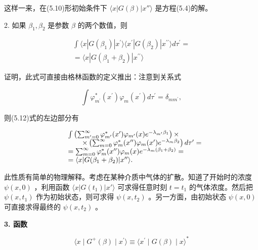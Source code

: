 这样一来，在(5.10)形初始条件下 $\langle x|G(\beta)|x''\rangle$ 是方程(5.4)的解。

2. 如果 $\beta_{1}, \beta_{2}$ 是参数 $\beta$ 的两个数值，则

\begin{equation*}
\begin{array}{l} \int \langle x | G (\beta_ {1}) | x ^ {\prime} \rangle \langle x ^ {\prime} | G (\beta_ {2}) | x ^ {\prime \prime} \rangle d \tau^ {\prime} = \\ = \langle x | G (\beta_ {1} + \beta_ {2}) | x ^ {\prime \prime} \rangle \end{array}\tag{5.12}
\end{equation*}

证明，此式可直接由格林函数的定义推出：注意到关系式

\begin{equation*}
\int \varphi_ {m ^ {\prime}} ^ {*} (x ^ {\prime}) \varphi_ {m} (x ^ {\prime}) d \tau^ {\prime} = \delta_ {m m ^ {\prime}},
\end{equation*}

则(5.12)式的左边部分有

\begin{equation*}
\begin{array}{r l} & {\int \left(\sum_ {m ^ {\prime} = 0} ^ {\infty} \varphi_ {m ^ {\prime}} ^ {*} (x ^ {\prime}) \varphi_ {m ^ {\prime}} (x) e ^ {- \lambda_ {m ^ {\prime}} \beta_ {1}}\right) \times} \\ & {\qquad \times \left(\sum_ {m = 0} ^ {\infty} \varphi_ {m} ^ {*} (x ^ {\prime \prime}) \varphi_ {m} (x ^ {\prime}) e ^ {- \lambda_ {m} \beta_ {2}}\right) d \tau^ {\prime} =} \\ & {= \sum_ {m = 0} ^ {\infty} \varphi_ {m} ^ {*} (x ^ {\prime \prime}) \varphi_ {m} (x) e ^ {- \lambda_ {m} (\beta_ {1} + \beta_ {2})} =} \\ & {= \langle x | G (\beta_ {1} + \beta_ {2}) | x ^ {\prime \prime} \rangle .} \end{array}
\end{equation*}

此性质有简单的物理解释。考虑在某种介质中气体的扩散。知道了开始时的浓度 $\psi(x,0)$ ，利用函数 $\langle x|G(t_{1})|x'\rangle$ 可求得任意时刻 $t=t_{1}$ 的气体浓度。然后把 $\psi(x,t_{1})$ 作为初始状态，则可求得 $\psi(x,t_{2})$ 。另一方面，由初始状态 $\psi(x,0)$ 可直接求得最终的 $\psi(x,t_{2})$ 。

\textbf{3. 函数}

\begin{equation*}
\langle x \mid G ^ {+} (\beta) \mid x ^ {\prime} \rangle \equiv \langle x ^ {\prime} \mid G (\beta) \mid x \rangle^ {*}
\end{equation*}

